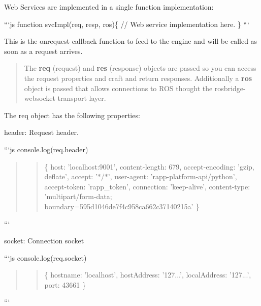 Web Services are implemented in a single function implementation\-:

```js function svc\-Impl(req, resp, ros)\{ // Web service implementation here. \} ```

This is the onrequest callback function to feed to the engine and will be called as soon as a request arrives.

\begin{quotation}
The {\bfseries req} (request) and {\bfseries res} (response) objects are passed so you can access the request properties and craft and return responses. Additionally a {\bfseries ros} object is passed that allows connections to R\-O\-S thought the rosbridge-\/websocket transport layer.

\end{quotation}


The {\ttfamily req} object has the following properties\-:
\begin{DoxyItemize}
\item {\ttfamily header}\-: Request header.
\end{DoxyItemize}

```js console.\-log(req.\-header) \begin{quotation}
\begin{quotation}
\{ host\-: 'localhost\-:9001', content-\/length\-: 679, accept-\/encoding\-: 'gzip, deflate', accept\-: '$\ast$/$\ast$', user-\/agent\-: 'rapp-\/platform-\/api/python', accept-\/token\-: 'rapp\-\_\-token', connection\-: 'keep-\/alive', content-\/type\-: 'multipart/form-\/data; boundary=595d1046de7f4c958ca662c37140215a' \}

\end{quotation}


\end{quotation}
```


\begin{DoxyItemize}
\item {\ttfamily socket}\-: Connection socket
\end{DoxyItemize}

```js console.\-log(req.\-socket) \begin{quotation}
\begin{quotation}
\{ hostname\-: 'localhost', host\-Address\-: '127...', local\-Address\-: '127...', port\-: 43661 \}

\end{quotation}


\end{quotation}
```



